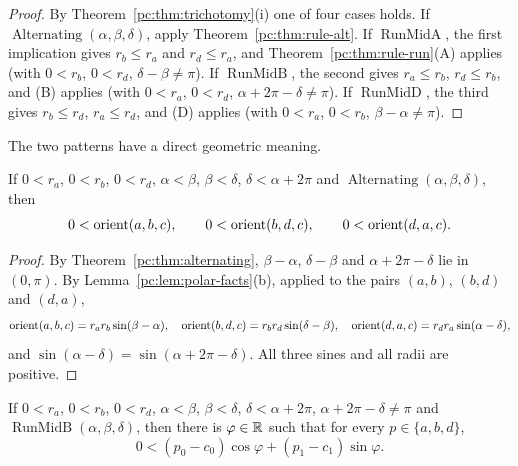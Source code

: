 \begin{proof}
By Theorem~\ref{pc:thm:trichotomy}(i) one of four cases holds. If $\operatorname{Alternating}(\alpha,\beta,\delta)$,
apply Theorem~\ref{pc:thm:rule-alt}. If $\operatorname{RunMidA}$, the first implication gives $r_b\le r_a$ and
$r_d\le r_a$, and Theorem~\ref{pc:thm:rule-run}(A) applies (with $0<r_b$, $0<r_d$, $\delta-\beta\neq\pi$). If
$\operatorname{RunMidB}$, the second gives $r_a\le r_b$, $r_d\le r_b$, and (B) applies (with $0<r_a$, $0<r_d$,
$\alpha+2\pi-\delta\neq\pi$). If $\operatorname{RunMidD}$, the third gives $r_b\le r_d$, $r_a\le r_d$, and (D)
applies (with $0<r_a$, $0<r_b$, $\beta-\alpha\neq\pi$).
\end{proof}

The two patterns have a direct geometric meaning.

\begin{proposition}\label{pc:prop:centre}
If $0<r_a$, $0<r_b$, $0<r_d$, $\alpha<\beta$, $\beta<\delta$, $\delta<\alpha+2\pi$ and
$\operatorname{Alternating}(\alpha,\beta,\delta)$, then
\[
  0<\operatorname{orient}(a,b,c),\qquad 0<\operatorname{orient}(b,d,c),\qquad 0<\operatorname{orient}(d,a,c).
\]
\end{proposition}

\begin{proof}
By Theorem~\ref{pc:thm:alternating}, $\beta-\alpha$, $\delta-\beta$ and $\alpha+2\pi-\delta$ lie in $(0,\pi)$. By
Lemma~\ref{pc:lem:polar-facts}(b), applied to the pairs $(a,b)$, $(b,d)$ and $(d,a)$,
\[
  \operatorname{orient}(a,b,c)=r_ar_b\sin(\beta-\alpha),\quad \operatorname{orient}(b,d,c)=r_br_d\sin(\delta-\beta),\quad
  \operatorname{orient}(d,a,c)=r_dr_a\sin(\alpha-\delta),
\]
and $\sin(\alpha-\delta)=\sin(\alpha+2\pi-\delta)$. All three sines and all radii are positive.
\end{proof}

\begin{proposition}\label{pc:prop:halfplane}
If $0<r_a$, $0<r_b$, $0<r_d$, $\alpha<\beta$, $\beta<\delta$, $\delta<\alpha+2\pi$, $\alpha+2\pi-\delta\neq\pi$ and
$\operatorname{RunMidB}(\alpha,\beta,\delta)$, then there is $\varphi\in\mathbb R$ such that for every
$p\in\{a,b,d\}$,
\[
  0<(p_0-c_0)\cos\varphi+(p_1-c_1)\sin\varphi .
\]
\end{proposition}

